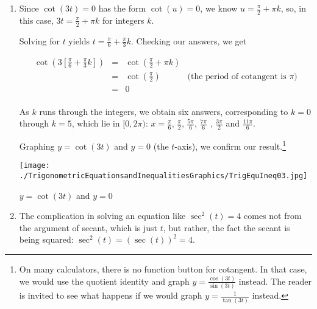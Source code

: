 \documentclass{ximera}
\begin{document}
\begin{example}
\begin{enumerate}
\begin{center}
\end{center}

\item  Since $\cot(3t) = 0$ has the form $\cot(u) = 0$, we know $u = \frac{\pi}{2} + \pi k$, so, in this case,  $3t =  \frac{\pi}{2} + \pi k$ for integers $k$.  

\smallskip

Solving for $t$ yields $t = \frac{\pi}{6} + \frac{\pi}{3} k$.  Checking our answers, we get

\[ \begin{array}{rclr}

\cot\left(3\left[ \frac{\pi}{6} + \frac{\pi}{3} k\right]\right)  &  = &  \cot\left(\frac{\pi}{2} + \pi k\right)  & \\ [3pt]
																												& =  &   \cot\left(\frac{\pi}{2}\right) &  \text{(the period of cotangent is $\pi$)} \\ [3pt]
																												& =  & 0 & \\
																								
\end{array}\] 

 As $k$ runs through the integers, we obtain six answers, corresponding to $k=0$ through $k=5$, which lie in $[0, 2\pi)$: $x = \frac{\pi}{6}$, $\frac{\pi}{2}$, $\frac{5\pi}{6}$, $\frac{7\pi}{6}$ , $\frac{3\pi}{2}$ and  $\frac{11\pi}{6}$. 
 
 \smallskip
 
 Graphing $y = \cot(3t)$ and $y=0$ (the $t$-axis), we confirm our result.\footnote{On many calculators, there is no function button for cotangent.  In that case, we would use the quotient identity and graph $y = \frac{\cos(3t)}{\sin(3t)}$ instead.  The reader is invited to see what happens if we would graph $y= \frac{1}{\tan(3t)}$ instead.}
 
 \begin{center}
 
 \texttt{[image: ./TrigonometricEquationsandInequalitiesGraphics/TrigEquIneq03.jpg]} 
 
 { \boldmath $y = \cot(3t)$}  and $y=0$ 
 
 \end{center}

\item The complication in solving an equation like $\sec^{2}(t) = 4$ comes not from the argument of secant, which is just $t$, but rather, the fact the secant is being squared:  $\sec^{2}(t) = (\sec(t))^2 = 4$.


\end{enumerate}
\end{example}
\end{document}
